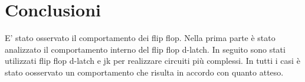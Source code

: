 \section{Conclusioni}
E' stato osservato il comportamento dei flip flop. Nella prima parte è stato analizzato il comportamento interno del flip flop d-latch. In seguito sono stati utilizzati flip flop d-latch e jk per realizzare circuiti più complessi. In tutti i casi è stato oosservato un comportamento che risulta in accordo con quanto atteso.  